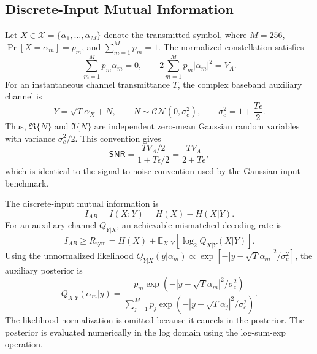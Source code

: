 \subsection{Discrete-Input Mutual Information}
\label{subsec:discrete_input_mi}

Let $X\in\mathcal{X}=\{\alpha_1,\ldots,\alpha_M\}$ denote the transmitted
symbol, where $M=256$, $\Pr[X=\alpha_m]=p_m$, and $\sum_{m=1}^{M}p_m=1$.
The normalized constellation satisfies
\begin{equation}
    \sum_{m=1}^{M}p_m\alpha_m=0,
    \qquad
    2\sum_{m=1}^{M}p_m|\alpha_m|^2=V_A.
\end{equation}
For an instantaneous channel transmittance $T$, the complex baseband auxiliary
channel is
\begin{equation}
    Y=\sqrt{T}\alpha_X+N,
    \qquad
    N\sim\mathcal{CN}(0,\sigma_c^2),
    \qquad
    \sigma_c^2=1+\frac{T\epsilon}{2}.
\end{equation}
Thus, $\Re\{N\}$ and $\Im\{N\}$ are independent zero-mean Gaussian random
variables with variance $\sigma_c^2/2$. This convention gives
\begin{equation}
    \mathsf{SNR}
    =\frac{T V_A/2}{1+T\epsilon/2}
    =\frac{T V_A}{2+T\epsilon},
\end{equation}
which is identical to the signal-to-noise convention used by the Gaussian-input
benchmark.

The discrete-input mutual information is
\begin{equation}
    I_{AB}=I(X;Y)=H(X)-H(X|Y).
\end{equation}
For an auxiliary channel $Q_{Y|X}$, an achievable mismatched-decoding rate is
\begin{equation}
    I_{AB}\geq R_{\mathrm{sym}}
    =H(X)+\mathbb{E}_{X,Y}
    \left[\log_2 Q_{X|Y}(X|Y)\right].
\end{equation}
Using the unnormalized likelihood
$Q_{Y|X}(y|\alpha_m)\propto
\exp[-|y-\sqrt{T}\alpha_m|^2/\sigma_c^2]$, the auxiliary posterior is
\begin{equation}
    Q_{X|Y}(\alpha_m|y)
    =\frac{p_m\exp\!\left(-|y-\sqrt{T}\alpha_m|^2/\sigma_c^2\right)}
    {\sum_{j=1}^{M}p_j\exp\!\left(-|y-\sqrt{T}\alpha_j|^2/\sigma_c^2\right)}.
\end{equation}
The likelihood normalization is omitted because it cancels in the posterior.
The posterior is evaluated numerically in the log domain using the
log-sum-exp operation.


